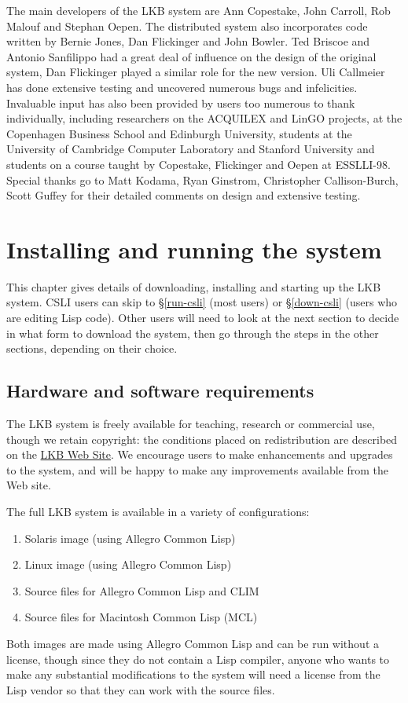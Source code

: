 \documentclass[12pt]{report}
\begin{document}
The main developers of the LKB system 
are Ann Copestake, John Carroll, Rob Malouf and Stephan Oepen.  
The distributed system also incorporates code
written by Bernie Jones, Dan Flickinger and   
John Bowler.  Ted Briscoe and Antonio Sanfilippo had a great 
deal of influence on the design of the original system,
Dan Flickinger played a similar role for the new version.
Uli Callmeier has done extensive testing and uncovered numerous
bugs and infelicities.
Invaluable input has also
been provided by users too numerous to thank individually, including
researchers on the ACQUILEX and LinGO projects, at
the Copenhagen Business School and Edinburgh University,
students
at the University of Cambridge Computer Laboratory and
Stanford University and students on a course taught by Copestake, Flickinger
and Oepen at ESSLLI-98.  Special thanks go to
Matt Kodama, Ryan Ginstrom, Christopher Callison-Burch, Scott Guffey
for their detailed comments on design and extensive testing.


\chapter{Installing and running the system}
\label{installation}

This chapter gives details of downloading, installing and 
starting up the LKB system.
CSLI users can skip to \S\ref{run-csli} (most users) or \S\ref{down-csli}
(users who are editing Lisp code).
Other users will need to look at the next section to decide in
what form to download the system, then go through the steps in the
other sections, depending on their 
choice.

\section{Hardware and software requirements}
\label{require}

The LKB system is freely available for teaching, research or commercial use,
though we retain copyright:
the conditions placed on redistribution are described on the 
\href{http://www-csli.stanford.edu/~aac/lkb.html}{LKB Web Site}.
We encourage users to make enhancements and upgrades to the system,
and will be happy to make any improvements available from the Web site.

The full LKB system is available in a variety of configurations:
\begin{enumerate}
\item Solaris image (using Allegro Common Lisp)
\item Linux image (using Allegro Common Lisp)
\item Source files for Allegro Common Lisp and CLIM
\item Source files for Macintosh Common Lisp (MCL)
\end{enumerate}
Both images are made using Allegro Common Lisp and
can be run without a license, though since they do not contain
a Lisp compiler, anyone who wants to make any substantial
modifications to the
system will need a license from the Lisp vendor
so that they can work with the source files.
\end{document}
